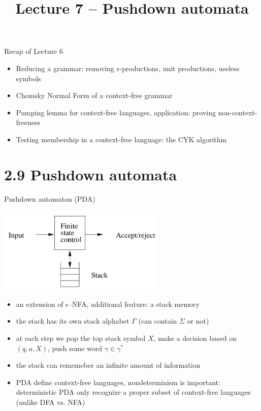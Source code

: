 \documentclass[handout]{beamer}
\title{Lecture 7 -- Pushdown automata}
\begin{document}
\frame{\titlepage}


\begin{frame}{Recap of Lecture 6}
	
    \begin{itemize}
		\item Reducing a grammar: removing $\epsilon$-productions, unit productions, useless symbols
		\item Chomsky Normal Form of a context-free grammar
		\item Pumping lemma for context-free languages, application: proving non-context-freeness
		\item Testing membership in a context-free language: the CYK algorithm
	\end{itemize}
	
\end{frame}


\section{2.9 Pushdown automata}


\begin{frame}{Pushdown automaton (PDA)}

    \vspace{-6pt}
    \begin{center}
        \includegraphics[width=0.6\textwidth]{files/pushDown.PNG}
    \end{center}
    \vspace{-12pt}

    \begin{itemize}
        \item an extension of $\epsilon$--NFA, additional feature: a \alert{stack} memory %
        \item the stack has its own \alert{stack alphabet} $\Gamma$ (can contain $\Sigma$ or not)
        \item at each step we pop the top stack symbol $X$, make a decision based on $(q,a,X)$, push some word $\gamma\in\gamma^*$
        \item the stack can rememeber an infinite amount of information
        \item PDA define context-free languages, nondeterminism is important: \alert{deterministic} PDA only recognize a proper subset of context-free languages (unlike DFA vs. NFA)
    \end{itemize}
    
\end{frame}
\end{document}
